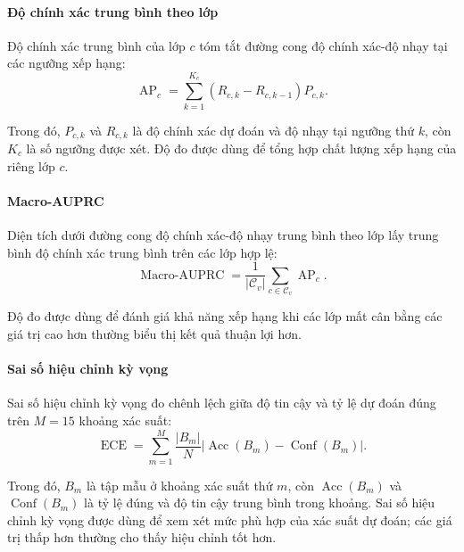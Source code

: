 \paragraph{Độ chính xác trung bình theo lớp}

Độ chính xác trung bình của lớp $c$ tóm tắt đường cong độ chính xác-độ nhạy tại các ngưỡng xếp hạng:
\begin{equation}
\operatorname{AP}_c=\sum_{k=1}^{K_c}(R_{c,k}-R_{c,k-1})P_{c,k}.
\label{eq:ch4_ap_class}
\end{equation}

Trong đó, $P_{c,k}$ và $R_{c,k}$ là độ chính xác dự đoán và độ nhạy tại ngưỡng thứ $k$, còn $K_c$ là số ngưỡng được xét. Độ đo được dùng để tổng hợp chất lượng xếp hạng của riêng lớp $c$.

\paragraph{Macro-AUPRC}

Diện tích dưới đường cong độ chính xác-độ nhạy trung bình theo lớp \cite{Davis2006PR} lấy trung bình độ chính xác trung bình trên các lớp hợp lệ:
\begin{equation}
\operatorname{Macro\text{-}AUPRC}
=\frac{1}{|\mathcal{C}_v|}\sum_{c\in\mathcal{C}_v}\operatorname{AP}_c.
\label{eq:ch4_macro_auprc}
\end{equation}

Độ đo được dùng để đánh giá khả năng xếp hạng khi các lớp mất cân bằng các giá trị cao hơn thường biểu thị kết quả thuận lợi hơn.

\paragraph{Sai số hiệu chỉnh kỳ vọng}

Sai số hiệu chỉnh kỳ vọng \cite{Guo2017Calibration} đo chênh lệch giữa độ tin cậy và tỷ lệ dự đoán đúng trên $M=15$ khoảng xác suất:
\begin{equation}
\operatorname{ECE}=\sum_{m=1}^{M}\frac{|B_m|}{N}
\left|\operatorname{Acc}(B_m)-\operatorname{Conf}(B_m)\right|.
\label{eq:ch4_ece}
\end{equation}

Trong đó, $B_m$ là tập mẫu ở khoảng xác suất thứ $m$, còn $\operatorname{Acc}(B_m)$ và $\operatorname{Conf}(B_m)$ là tỷ lệ đúng và độ tin cậy trung bình trong khoảng. Sai số hiệu chỉnh kỳ vọng được dùng để xem xét mức phù hợp của xác suất dự đoán; các giá trị thấp hơn thường cho thấy hiệu chỉnh tốt hơn.

